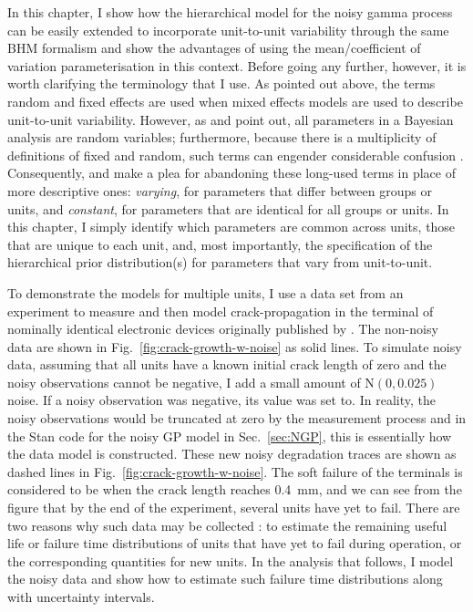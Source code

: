 In this chapter, I show how the hierarchical model for the noisy gamma process can be easily extended to incorporate unit-to-unit variability through the same BHM formalism and show the advantages of using the mean/coefficient of variation parameterisation in this context. Before going any further, however, it is worth clarifying the terminology that I use. As pointed out above, the terms random and fixed effects are used when mixed effects models are used to describe unit-to-unit variability. However, as \citet{Gelman2005} and \citet{gelman2006} point out, all parameters in a Bayesian analysis are random variables; furthermore, because there is a multiplicity of definitions of fixed and random, such terms can engender considerable confusion \citep[Sec.~6]{Gelman2005}. Consequently, \citet{Gelman2005} and \citet{gelman2006} make a plea for abandoning these long-used terms in place of more descriptive ones: \emph{varying}, for parameters that differ between groups or units, and \emph{constant}, for parameters that are identical for all groups or units. In this chapter, I simply identify which parameters are common across units, those that are unique to each unit, and, most importantly, the specification of the hierarchical prior distribution(s) for parameters that vary from unit-to-unit.

To demonstrate the models for multiple units, I use a data set from an experiment to measure and then model crack-propagation in the terminal of nominally identical electronic devices originally published by \citet{rodriguez-picon2018}. The non-noisy data are shown in Fig.~\ref{fig:crack-growth-w-noise} as solid lines. To simulate noisy data, assuming that all units have a known initial crack length of zero and the noisy observations cannot be negative, I add a small amount of $\mathrm{N}(0, 0.025)$ noise. If a noisy observation was negative, its value was set to. In reality, the noisy observations would be truncated at zero by the measurement process and in the Stan code for the noisy GP model in Sec.~\ref{sec:NGP}, this is essentially how the data model is constructed. These new noisy degradation traces are shown as dashed lines in Fig.~\ref{fig:crack-growth-w-noise}. The soft failure of the terminals is considered to be when the crack length reaches 0.4~mm, and we can see from the figure that by the end of the experiment, several units have yet to fail. There are two reasons why such data may be collected \citep{robinson2000}: to estimate the remaining useful life or failure time distributions of units that have yet to fail during operation, or the corresponding quantities for new units. In the analysis that follows, I model the noisy data and show how to estimate such failure time distributions along with uncertainty intervals.

